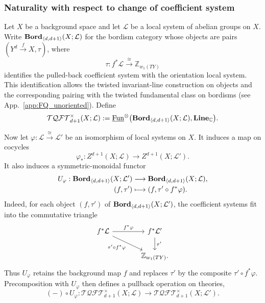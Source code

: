 \documentclass[aps,prx,reprint,superscriptaddress,twocolumn,amsmath,amssymb,amsfonts, nofootinbib]{revtex4-2}
\newcommand{\bordd}{{\bf Bord}_{\langle d, d+1\rangle}}
\newcommand{\Line}{{\bf Line}_{\mathbb{C}}}
\newcommand{\tqftd}{\mathcal{TQFT}_{d+1}}
\theoremstyle{apsstyle}
\begin{document}
\subsubsection{Naturality with respect to change of coefficient system}
\label{app:naturality_coeff_freedquinn}


Let $X$ be a background space and let $\mathcal L$ be a local system of abelian groups on $X$. Write $\bordd(X;\mathcal L)$ for the bordism category whose objects are pairs $(Y^d\xrightarrow{f}X,\tau)$, where
\begin{equation*}
    \tau:
    f^*\mathcal L
    \xrightarrow{\;\cong\;}
    \mathbb Z_{w_1(TY)}
\end{equation*}
identifies the pulled-back coefficient system with the orientation local system. This identification allows the twisted invariant-line construction on objects and the corresponding pairing with the twisted fundamental class on bordisms (see App.~\ref{app:FQ_unoriented}). Define
\begin{equation*}
    \tqftd^\times(X;\mathcal L)
    :=
    \underline{\mathrm{Fun}}^\otimes
    \bigl(\bordd(X;\mathcal L),\Line\bigr).
\end{equation*}


Now let $\varphi:\mathcal L\xrightarrow{\cong}\mathcal L'$ be an isomorphism of local systems on $X$. It induces a map on cocycles
\begin{equation*}
    \varphi_*:
    Z^{d+1}(X;\mathcal L)
    \longrightarrow
    Z^{d+1}(X;\mathcal L').
\end{equation*}
It also induces a symmetric-monoidal functor
\begin{align*}
U_{\varphi}:
\bordd(X;\mathcal L')
&\longrightarrow
\bordd(X;\mathcal L),
\\
(f,\tau')
&\longmapsto
(f,\tau'\circ f^*\varphi).
\end{align*}
Indeed, for each object $(f,\tau')$ of $\bordd(X;\mathcal L')$, the coefficient systems fit into the
commutative triangle
\begin{equation*}
\begin{tikzcd}[column sep=large]
f^*\mathcal L
\arrow[r,"f^*\varphi"]
\arrow[dr,"\tau'\circ f^*\varphi"']
&
f^*\mathcal L'
\arrow[d,"\tau'"]
\\
&
\mathbb Z_{w_1(TY)}.
\end{tikzcd}
\end{equation*}
Thus $U_\varphi$ retains the background map $f$ and replaces $\tau'$ by the composite $\tau'\circ f^*\varphi$. Precomposition with $U_\varphi$ then defines a pullback operation on theories,
\begin{equation*}
(-)\circ U_{\varphi}:
\tqftd^{\times}(X;\mathcal L)
\longrightarrow
\tqftd^{\times}(X;\mathcal L').
\end{equation*}
\end{document}
